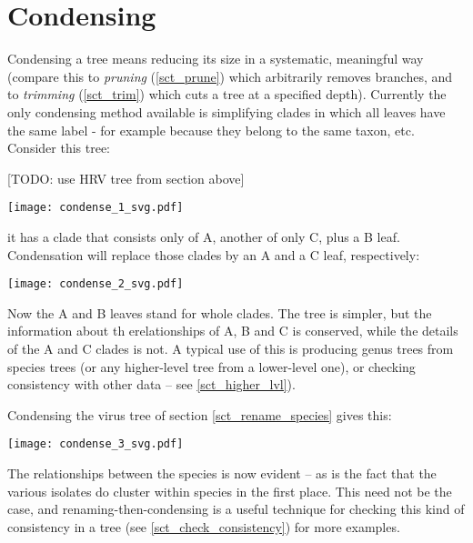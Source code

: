 \section{Condensing}
\label{sct_condense}

Condensing a tree means reducing its size in a systematic, meaningful way
(compare this to \emph{pruning} (\ref{sct_prune}) which arbitrarily removes
branches, and to \textit{trimming} (\ref{sct_trim}) which cuts a tree at a
specified depth). Currently the only condensing method available is
simplifying clades in which all leaves have the same label - for example
because they belong to the same taxon, etc. Consider this tree:

[TODO: use HRV tree from section above]

\begin{center}
\texttt{[image: condense\_1\_svg.pdf]}
\end{center}

\noindent{}it has a clade that consists only of A, another of only C, plus a B
leaf.  Condensation will replace those clades by an A and a C leaf,
respectively:


\begin{center}
\texttt{[image: condense\_2\_svg.pdf]}
\end{center}

\noindent{}Now the A and B leaves stand for whole clades. The tree is simpler,
but the information about th erelationships of A, B and C is conserved, while
the details of the A and C clades is not.  A typical use of this is producing
genus trees from species trees (or any higher-level tree from a lower-level
one), or checking consistency with other data -- see \ref{sct_higher_lvl}).

Condensing the virus tree of section \ref{sct_rename_species} gives this:

\texttt{[image: condense\_3\_svg.pdf]}

\noindent{}The relationships between the species is now evident -- as is the
fact that the various isolates do cluster within species in the first place.
This need not be the case, and renaming-then-condensing is a useful technique
for checking this kind of consistency in a tree (see
\ref{sct_check_consistency}) for more examples.
